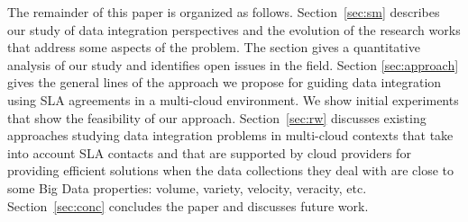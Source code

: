 The remainder of this paper is organized as follows. 
Section~\ref{sec:sm} describes our study of  data integration perspectives and the evolution of the research works that address some aspects of the problem. The section gives a quantitative analysis of our study and identifies open issues in the field. Section \ref{sec:approach} gives the general lines of the approach we propose for guiding data integration using SLA agreements in a multi-cloud environment. We show initial experiments that show the feasibility of our approach.  Section~\ref{sec:rw} discusses existing approaches studying data integration problems in multi-cloud contexts that take into account SLA contacts and that are supported by cloud providers for providing efficient solutions when the data collections they deal with are close to some Big Data properties: volume, variety, velocity, veracity, etc.
Section~\ref{sec:conc} concludes the paper and discusses future work. 


